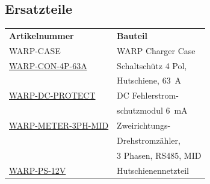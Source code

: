 \documentclass[a4paper,10pt]{article}
\begin{document}
\begin{multicols*}{2}
	\subsection{Ersatzteile}
	\begin{tabular}{ll}
		\textbf{Artikelnummer}                                                                                                   & \textbf{Bauteil}                                              \\
		\cmidrule(lr{0.5em}){1-2}
		WARP-CASE                                                                                                                & WARP Charger Case                                             \\
		\cmidrule(lr{0.5em}){1-2}
		\href{https://www.tinkerforge.com/de/shop/warp/contactor-4-pole-din-rail-63a.html}{WARP-CON-4P-63A}                      & Schaltschütz 4 Pol,                                           \\
		                                                                                                                         & Hutschiene, \SI{63}{\ampere}                                  \\
		\cmidrule(lr{0.5em}){1-2}
		\href{https://www.tinkerforge.com/de/shop/warp/dc-residual-current-protection-module-6ma.html}{WARP-DC-PROTECT}          & DC Fehlerstrom-                                               \\
		                                                                                                                         & schutzmodul \SI{6}{\milli\ampere}                             \\
		\cmidrule(lr{0.5em}){1-2}
		\href{https://www.tinkerforge.com/de/shop/warp/bidirectional-polyphase-meter-3-phase-rs485-mid.html}{WARP-METER-3PH-MID} & Zweirichtungs-                                                \\
		                                                                                                                         & Drehstromzähler,                                              \\
		                                                                                                                         & 3 Phasen, RS485, MID                                          \\
		\cmidrule(lr{0.5em}){1-2}
		\href{https://www.tinkerforge.com/de/shop/warp/din-rail-power-supply-230vac-12vdc-1-25a.html}{WARP-PS-12V}               & Hutschienennetzteil                                           \\

\end{tabular}
\end{multicols*}
\end{document}
